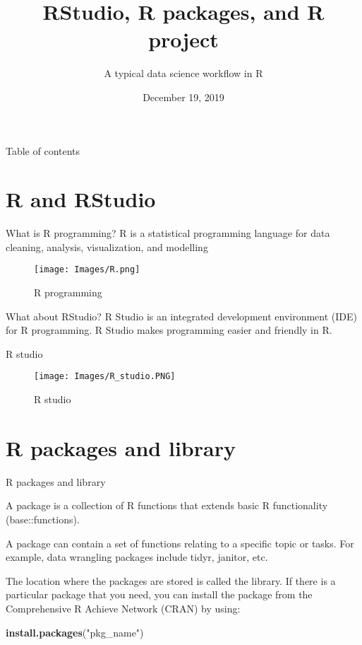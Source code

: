 \documentclass[
  ignorenonframetext,
]{beamer}
\title{RStudio, R packages, and R project}
\subtitle{A typical data science workflow in R}
\date{December 19, 2019}
\newenvironment{Shaded}{\begin{snugshade}}{\end{snugshade}}
\newcommand{\KeywordTok}[1]{\textcolor[rgb]{0.13,0.29,0.53}{\textbf{#1}}}
\newcommand{\NormalTok}[1]{#1}
\newcommand{\StringTok}[1]{\textcolor[rgb]{0.31,0.60,0.02}{#1}}
\begin{document}
\frame{\titlepage}


\begin{frame}{Table of contents}
	\tableofcontents[hideallsubsections]
\end{frame}



\section{R and RStudio}
\begin{frame}{What is R programming?}
\protect\hypertarget{what-is-r-programming}{}
\pause
R is a statistical programming language for data cleaning, analysis, visualization, and modelling \pause

\begin{figure}
\centering
\texttt{[image: Images/R.png]}
\caption{R programming}
\end{figure}

\end{frame}

\begin{frame}{What about RStudio?}
\protect\hypertarget{what-about-rstudio}{}
\pause
R Studio is an integrated development environment (IDE) for R
programming. R Studio makes programming easier and friendly in R.

\end{frame}

\begin{frame}{R studio}
\protect\hypertarget{r-studio}{}

\begin{figure}
\centering
\texttt{[image: Images/R\_studio.PNG]}
\caption{R studio}
\end{figure}

\end{frame}

\section{R packages and library}

\begin{frame}[fragile]{R packages and library}
\protect\hypertarget{r-packages-and-library}{}

A package is a collection of R functions that extends basic R
functionality (base::functions). \pause

A package can contain a set of functions relating to a specific topic or
tasks. For example, data wrangling packages include tidyr, janitor, etc.
\pause

The location where the packages are stored is called the library. If there is a particular package that you need, you can install the package from the Comprehensive R Achieve Network (CRAN) by using:\pause

\begin{Shaded}
\begin{Highlighting}[]
\KeywordTok{install.packages}\NormalTok{(}\StringTok{"pkg_name"}\NormalTok{)}
\end{Highlighting}
\end{Shaded}

\end{frame}
\end{document}
